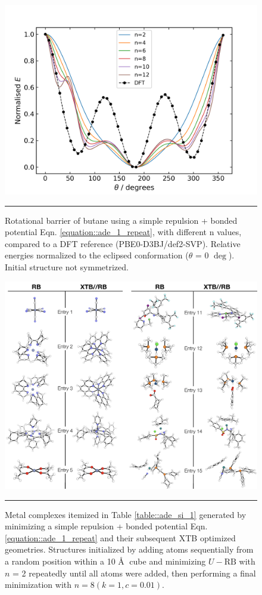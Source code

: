 \documentclass[../../main.tex]{subfiles}
\begin{document}
\begin{figure}[h!]
	\vspace{0.4cm}
	\centering
	\includegraphics[width=12cm]{5/autode/figs/figS4}
	\vspace{0.4cm}
	\hrule
	\caption{Rotational barrier of butane using a simple repulsion + bonded potential Eqn. \ref{equation::ade_1_repeat}, with different n values, compared to a DFT reference (PBE0-D3BJ/def2-SVP). Relative energies normalized to the eclipsed conformation ($\theta$ = 0 $\deg$). Initial structure not symmetrized.}
	\label{fig::ade_si_4}
\end{figure}



\begin{figure}[h!]
	\vspace{0.4cm}
	\centering
	\includegraphics[width=\textwidth]{5/autode/figs/figS5a}
	\vspace{0.4cm}
	\hrule
	\caption{Metal complexes itemized in Table \ref{table::ade_si_1} generated by minimizing a simple repulsion + bonded potential Eqn. \eqref{equation::ade_1_repeat} and their subsequent XTB optimized geometries. Structures initialized by adding atoms sequentially from a random position within a 10 \AA$\;$ cube and minimizing $U-\text{RB}$ with $n$ = 2 repeatedly until all atoms were added, then performing a final minimization with $n = 8 (k = 1, c = 0.01)$.}
	\label{fig::ade_si_5a}
\end{figure}
\end{document}
